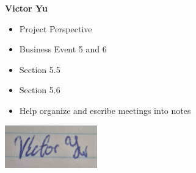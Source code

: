 \documentclass[]{article}
\begin{document}
\textbf{Victor Yu}
\begin{itemize}
    \setlength\itemindent{2em}
\item Project Perspective
\item Business Event 5 and 6
\item Section 5.5
\item Section 5.6
\item Help organize and escribe meetings into notes
\end{itemize}
\includegraphics[width=0.3\textwidth]{Victor.png}

\end{document}
